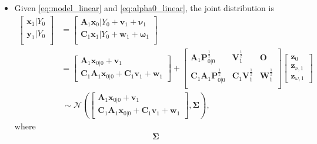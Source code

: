 \documentclass[12pt,a4paper]{article}
\begin{document}
\begin{itemize}
\begin{itemize}
\begin{itemize}
    \item Given \eqref{eq:model_linear} and \eqref{eq:alpha0_linear},
      the joint distribution is
      \begin{align}
        \begin{bmatrix}
          \bm{x}_{1}|Y_{0}\\
          \bm{y}_{1}|Y_{0}\\
        \end{bmatrix}
        & =
          \begin{bmatrix}
            \bm{A}_{1}\bm{x}_{0}|Y_{0} + \bm{v}_{1} + \bm{\nu}_{1}\\
            \bm{C}_{1}\bm{x}_{1}|Y_{0} + \bm{w}_{1} + \bm{\omega}_{1}\\
          \end{bmatrix}
          \nonumber \\
        & =
          \begin{bmatrix}
            \bm{A}_{1}\bm{x}_{0|0} + \bm{v}_{1}\\
            \bm{C}_{1}\bm{A}_{1}\bm{x}_{0|0} + \bm{C}_{1}\bm{v}_{1} + \bm{w}_{1}
          \end{bmatrix}
          +
          \begin{bmatrix}
            \bm{A}_{1}\bm{P}_{0|0}^{\frac{1}{2}} & \bm{V}_{1}^{\frac{1}{2}} & \bm{O} \\
            \bm{C}_{1}\bm{A}_{1}\bm{P}_{0|0}^{\frac{1}{2}} & \bm{C}_{1}\bm{V}_{1}^{\frac{1}{2}} & \bm{W}_{1}^{\frac{1}{2}}\\
          \end{bmatrix}
          \begin{bmatrix}
            \bm{z}_{0}\\
            \bm{z}_{\nu,1}\\
            \bm{z}_{\omega,1}
          \end{bmatrix}
          \nonumber \\
          & ~ \sim
          \mathcal{N} \left(
          \begin{bmatrix}
            \bm{A}_{1}\bm{x}_{0|0} + \bm{v}_{1}\\
            \bm{C}_{1}\bm{A}_{1}\bm{x}_{0|0} + \bm{C}_{1}\bm{v}_{1} + \bm{w}_{1}
          \end{bmatrix},
          \bm{\Sigma}
          \right),
          \label{eq:alpha1y1Y0_linear}%
      \end{align}
      where
      \begin{align}\nonumber%
        \bm{\Sigma}

\end{align}
\end{itemize}
\end{itemize}
\end{itemize}
\end{document}
